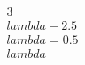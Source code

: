 \documentclass[preview]{standalone}
\begin{document}
\begin{align*}
3\\lambda - 2.5\\lambda = 0.5\\lambda
\end{align*}
\end{document}
